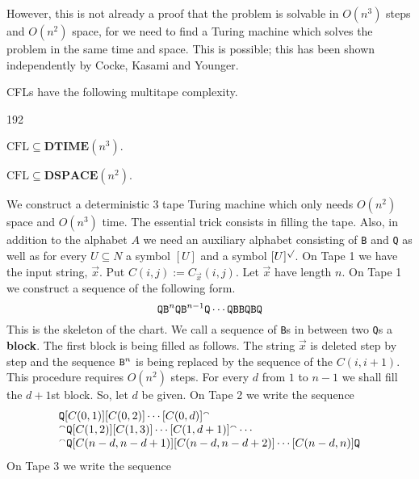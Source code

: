 However, this is not already a proof that the problem is
solvable in $O(n^3)$ steps and $O(n^2)$ space, for we need
to find a Turing machine which solves the problem in the
same time and space. This is possible; this has been shown
independently by Cocke, Kasami and Younger.
\nocite{younger:cfg}\nocite{kasami:cfg}
\begin{thm}
\label{thm:cky}
CFLs have the following multitape complexity.
\begin{dingautolist}{192}
\item
$\text{CFL} \subseteq \textbf{DTIME}(n^3)$.
\item
$\text{CFL} \subseteq \textbf{DSPACE}(n^2)$.
\end{dingautolist}
\end{thm}
\proofbeg
We construct a deterministic 3 tape Turing machine which only
needs $O(n^2)$ space and $O(n^3)$ time. The essential trick
consists in filling the tape. Also, in addition to the alphabet 
$A$ we need an auxiliary alphabet consisting of
{\tt B} and {\tt Q} as well as for every $U \subseteq N$ 
a symbol $[U]$ and a symbol $[U]^{\surd}$. On Tape 1 we have
the input string, $\vec{x}$. Put $C(i,j) := C_{\vec{x}}(i,j)$.
Let $\vec{x}$ have length $n$. On Tape 1 we construct a
sequence of the following form.
\begin{equation}
\mbox{\tt Q}\mbox{\tt B}^n \mbox{\tt Q}\mbox{\tt B}^{n-1}
\mbox{\tt Q} \dotsb \mbox{\tt QBBQBQ}
\end{equation}
This is the skeleton of the chart. We call a sequence of
{\tt B}s in between two {\tt Q}s a \textbf{block}. The first block
is being filled as follows. The string $\vec{x}$ is deleted
step by step and the sequence $\mbox{\tt B}^n$ is being replaced
by the sequence of the $C(i,i+1)$. This procedure requires
$O(n^2)$ steps. For every $d$ from $1$ to $n-1$ we shall fill
the $d+1$st block. So, let $d$ be given. On Tape 2 we write
the sequence
\begin{equation}
\begin{array}{l}
\mbox{\tt Q}[C(0,1)][C(0,2)]\dotsb [C(0,d)]{^{\smallfrown}} \\
{^{\smallfrown}} \mbox{\tt Q} [C(1,2)][C(1,3)]\dotsb[C(1,d+1)]{^{\smallfrown}}\dotsb \\
{^{\smallfrown}}\mbox{\tt Q}[C(n-d,n-d+1)][C(n-d,n-d+2)]\dotsb [C(n-d,n)]
\mbox{\tt Q}
\end{array}
\end{equation}
On Tape 3 we write the sequence
